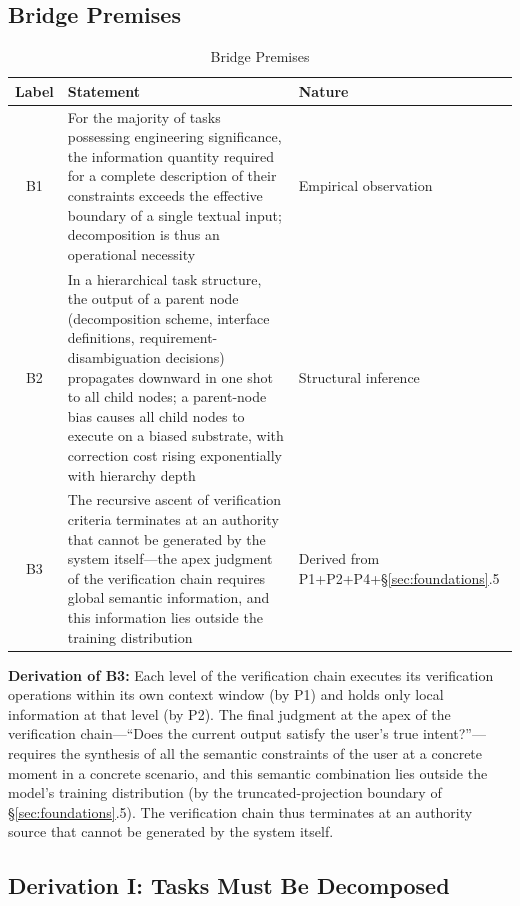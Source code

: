 \documentclass[11pt,a4paper]{article}
\theoremstyle{definition}
\begin{document}
\subsection{Bridge Premises}

\begin{table}[H]
\centering
\caption{Bridge Premises}
\begin{tabular}{@{}c@{}p{7cm}@{}p{3cm}@{}}
\toprule
\textbf{Label} & \textbf{Statement} & \textbf{Nature} \\
\midrule
B1 & For the majority of tasks possessing engineering significance, the information quantity required for a complete description of their constraints exceeds the effective boundary of a single textual input; decomposition is thus an operational necessity & Empirical observation \\
B2 & In a hierarchical task structure, the output of a parent node (decomposition scheme, interface definitions, requirement-disambiguation decisions) propagates downward in one shot to all child nodes; a parent-node bias causes all child nodes to execute on a biased substrate, with correction cost rising exponentially with hierarchy depth & Structural inference \\
B3 & The recursive ascent of verification criteria terminates at an authority that cannot be generated by the system itself---the apex judgment of the verification chain requires global semantic information, and this information lies outside the training distribution & Derived from P1+P2+P4+\S\ref{sec:foundations}.5 \\
\bottomrule
\end{tabular}
\end{table}

\textbf{Derivation of B3:} Each level of the verification chain executes its verification operations within its own context window (by P1) and holds only local information at that level (by P2). The final judgment at the apex of the verification chain---``Does the current output satisfy the user's true intent?''---requires the synthesis of all the semantic constraints of the user at a concrete moment in a concrete scenario, and this semantic combination lies outside the model's training distribution (by the truncated-projection boundary of \S\ref{sec:foundations}.5). The verification chain thus terminates at an authority source that cannot be generated by the system itself.

\subsection{Derivation I: Tasks Must Be Decomposed}
\end{document}

